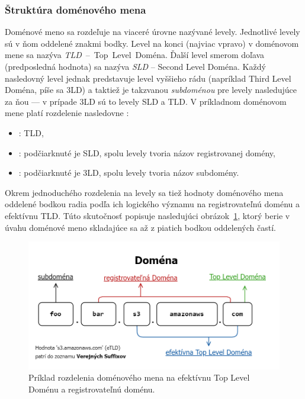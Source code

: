 \subsubsection{Štruktúra doménového mena}

Doménové meno sa rozdeľuje na viaceré úrovne nazývané levely. 
Jednotlivé levely sú v ňom oddelené znakmi bodky. 
Level na konci (najviac vpravo) v doménovom mene sa nazýva \mbox{\emph{TLD} -- Top Level Doména}. 
Ďalší level smerom doľava (predposledná hodnota) sa nazýva \emph{SLD} -- Second Level Doména.
Každý nasledovný level jednak predstavuje level vyššieho rádu (napríklad Third Level Doména, píše sa 3LD) a taktiež je takzvanou \emph{subdoménou} pre levely nasledujúce za ňou --- v prípade 3LD sú to levely SLD a TLD.
V príkladnom doménovom mene  platí rozdelenie nasledovne \cite{michal-spacek-etld-article}: 
\begin{itemize}    
    \item {}: TLD,
    \item {}: podčiarknuté je SLD, spolu levely tvoria názov registrovanej domény,
    \item {}: podčiarknuté je 3LD, spolu levely tvoria názov subdomény.
\end{itemize}

Okrem jednoduchého rozdelenia na levely sa tiež hodnoty doménového mena oddelené bodkou radia podľa ich logického významu na registrovateľnú doménu a efektívnu TLD.
Túto skutočnosť popisuje nasledujúci \mbox{obrázok \ref{fig:domain-name-structure}}, \mbox{ktorý} berie v úvahu doménové meno skladajúce sa až z piatich bodkou oddelených častí.

\begin{figure}[htb]
\begin{center}
 \includegraphics[scale=0.45]{obrazky-figures/domain_name_structure.png}
 \caption{Príklad rozdelenia doménového mena na efektívnu Top Level Doménu a registrovateľnú doménu.}
 \label{fig:domain-name-structure}
\end{center}
\end{figure}

